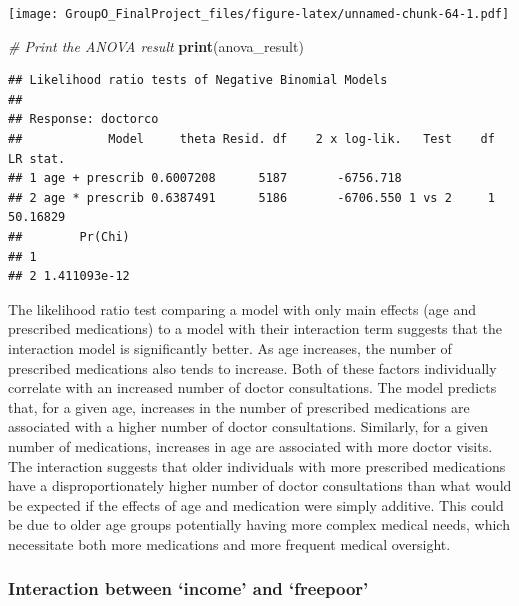 \documentclass[
]{article}
\newenvironment{Shaded}{\begin{snugshade}}{\end{snugshade}}
\newcommand{\CommentTok}[1]{\textcolor[rgb]{0.56,0.35,0.01}{\textit{#1}}}
\newcommand{\FunctionTok}[1]{\textcolor[rgb]{0.13,0.29,0.53}{\textbf{#1}}}
\newcommand{\NormalTok}[1]{#1}
\begin{document}
\texttt{[image: GroupO\_FinalProject\_files/figure-latex/unnamed-chunk-64-1.pdf]}

\begin{Shaded}
\begin{Highlighting}[]
\CommentTok{\# Print the ANOVA result}
\FunctionTok{print}\NormalTok{(anova\_result)}
\end{Highlighting}
\end{Shaded}

\begin{verbatim}
## Likelihood ratio tests of Negative Binomial Models
## 
## Response: doctorco
##            Model     theta Resid. df    2 x log-lik.   Test    df LR stat.
## 1 age + prescrib 0.6007208      5187       -6756.718                      
## 2 age * prescrib 0.6387491      5186       -6706.550 1 vs 2     1 50.16829
##        Pr(Chi)
## 1             
## 2 1.411093e-12
\end{verbatim}

The likelihood ratio test comparing a model with only main effects (age
and prescribed medications) to a model with their interaction term
suggests that the interaction model is significantly better. As age
increases, the number of prescribed medications also tends to increase.
Both of these factors individually correlate with an increased number of
doctor consultations. The model predicts that, for a given age,
increases in the number of prescribed medications are associated with a
higher number of doctor consultations. Similarly, for a given number of
medications, increases in age are associated with more doctor visits.
The interaction suggests that older individuals with more prescribed
medications have a disproportionately higher number of doctor
consultations than what would be expected if the effects of age and
medication were simply additive. This could be due to older age groups
potentially having more complex medical needs, which necessitate both
more medications and more frequent medical oversight.

\subsubsection{Interaction between `income' and
`freepoor'}\label{interaction-between-income-and-freepoor}
\end{document}
